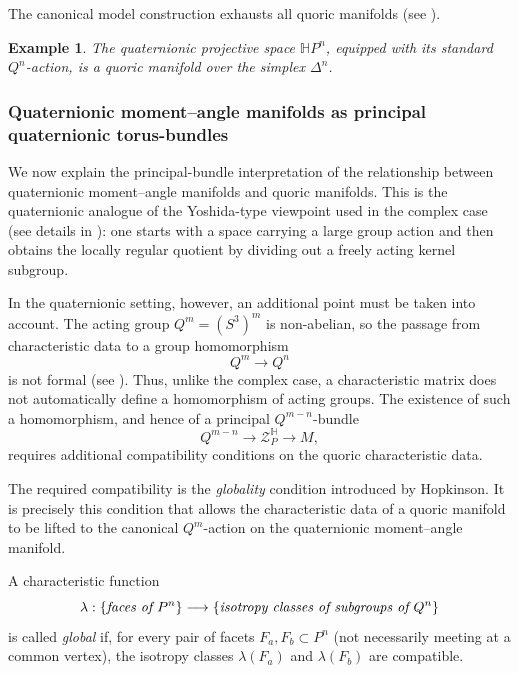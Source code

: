 \documentclass[11pt,a4paper]{article}
\numberwithin{equation}{section}
\newtheorem{example}[definition]{Example}
\theoremstyle{named}
\begin{document}
The canonical model construction exhausts all quoric manifolds (see \cite[Proposition 4.2.10]{ho}).

\begin{example}
The quaternionic projective space \(\mathbb H P^n\), equipped with its standard \(Q^n\)-action, is a quoric manifold over the simplex \(\Delta^n\).
\end{example}

\subsubsection{Quaternionic moment--angle manifolds as principal quaternionic torus-bundles}
\label{sec:ma_principal_Q_bundle}

We now explain the principal-bundle interpretation of the relationship between quaternionic moment--angle manifolds and quoric manifolds. This is the quaternionic analogue of the Yoshida-type viewpoint used in the complex case (see details in \cite{bg26}): one starts with a space carrying a large group action and then obtains the locally regular quotient by dividing out a freely acting kernel subgroup.

In the quaternionic setting, however, an additional point must be taken into account. The acting group $Q^m=(S^3)^m$ is non-abelian, so the passage from characteristic data to a group homomorphism
\[
    Q^m\longrightarrow Q^n
\] is not formal (see \cite[\S 5]{ho}).  Thus, unlike the complex case, a characteristic matrix does not automatically define a homomorphism of acting groups. The existence of such a homomorphism, and hence of a principal \(Q^{m-n}\)-bundle
\[
    Q^{m-n}\longrightarrow \mathcal Z_P^{\mathbb H}
    \longrightarrow M,
\]
requires additional compatibility conditions on the quoric characteristic data.

The required compatibility is the \emph{globality} condition introduced by Hopkinson. It is precisely this condition that allows the characteristic data of a quoric manifold to be lifted to the canonical \(Q^m\)-action on the quaternionic moment--angle manifold.

\begin{definition}
A characteristic function
\[
\lambda:\{\emph{faces of }P^n\}\longrightarrow
\{\emph{isotropy classes of subgroups of }Q^n\}
\]
is called \emph{global} if, for every pair of facets \(F_a,F_b\subset P^n\) (not necessarily meeting at a common vertex), the isotropy classes \(\lambda(F_a)\) and \(\lambda(F_b)\) are compatible.
\end{definition}
\end{document}

